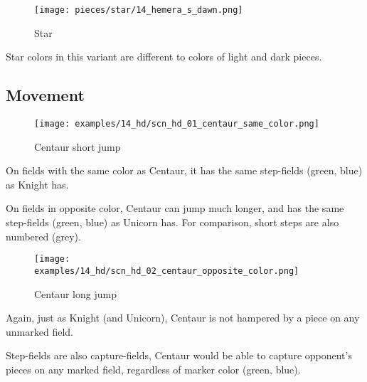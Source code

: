 \noindent
\begin{wrapfigure}{l}{0.4\textwidth}
\centering
\texttt{[image: pieces/star/14\_hemera\_s\_dawn.png]}
\caption{Star}
\label{fig:star/14_hemera_s_dawn}
\end{wrapfigure}
Star colors in this variant are different to colors of light and dark pieces.

\clearpage %

\subsection*{Movement}
\label{sec:Hemera's Dawn/Centaur/Movement}

\vspace*{-0.7\baselineskip}
\noindent
\begin{minipage}{\textwidth}
\begin{wrapfigure}[9]{l}{0.4\textwidth}
\centering
\texttt{[image: examples/14\_hd/scn\_hd\_01\_centaur\_same\_color.png]}
\vspace*{-0.7\baselineskip}
\caption{Centaur short jump}
\label{fig:scn_hd_01_centaur_same_color}
\end{wrapfigure}
On fields with the same color as Centaur, it has the same step-fields (green, blue)
as Knight has.

\mbox{}\newline %
On fields in opposite color, Centaur can jump much longer, and has the same step-fields
(green, blue) as Unicorn has. For comparison, short steps are also numbered (grey).
\end{minipage}

\vspace*{0.9\baselineskip}
\noindent
\begin{minipage}{\textwidth}
\begin{wrapfigure}[14]{l}{0.6\textwidth}
\centering
\texttt{[image: examples/14\_hd/scn\_hd\_02\_centaur\_opposite\_color.png]}
\vspace*{-0.7\baselineskip}
\caption{Centaur long jump}
\label{fig:scn_hd_02_centaur_opposite_color}
\end{wrapfigure}
Again, just as Knight (and Unicorn), Centaur is not hampered by a piece on any
unmarked field.

\mbox{}\newline %
Step-fields are also capture-fields, Centaur would be able to capture opponent's
pieces on any marked field, regardless of marker color (green, blue).
\end{minipage}

